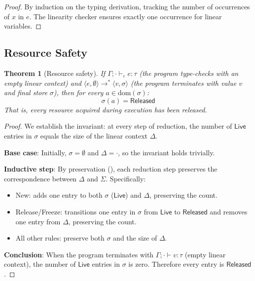 \documentclass[11pt]{article}
\newtheorem{theorem}{Theorem}[section]
\begin{document}
\begin{proof}
By induction on the typing derivation, tracking the number of
occurrences of $x$ in $e$.  The linearity checker ensures exactly one
occurrence for linear variables.
\end{proof}

\subsection{Resource Safety}

\begin{theorem}[Resource safety]\label{thm:resource-safety-proof}
If $\Gamma; \cdot \vdash_\varepsilon e : \tau$ (the program type-checks
with an empty linear context) and
$\langle e, \emptyset \rangle \longrightarrow^* \langle v, \sigma \rangle$
(the program terminates with value $v$ and final store $\sigma$), then
for every $a \in \mathrm{dom}(\sigma)$:
\[
  \sigma(a) = \mathsf{Released}
\]
That is, every resource acquired during execution has been released.
\end{theorem}

\begin{proof}
We establish the invariant: at every step of reduction, the number of
$\mathsf{Live}$ entries in $\sigma$ equals the size of the linear
context $\Delta$.

\textbf{Base case}: Initially, $\sigma = \emptyset$ and $\Delta =
\cdot$, so the invariant holds trivially.

\textbf{Inductive step}: By preservation (),
each reduction step preserves the correspondence between $\Delta$ and
$\Sigma$.  Specifically:
\begin{itemize}
  \item New: adds one entry to both $\sigma$ ($\mathsf{Live}$) and
        $\Delta$, preserving the count.
  \item Release/Freeze: transitions one entry in $\sigma$ from
        $\mathsf{Live}$ to $\mathsf{Released}$ and removes one entry
        from $\Delta$, preserving the count.
  \item All other rules: preserve both $\sigma$ and the size of $\Delta$.
\end{itemize}

\textbf{Conclusion}: When the program terminates with
$\Gamma; \cdot \vdash v : \tau$ (empty linear context), the number
of $\mathsf{Live}$ entries in $\sigma$ is zero.  Therefore every
entry is $\mathsf{Released}$.
\end{proof}
\end{document}
